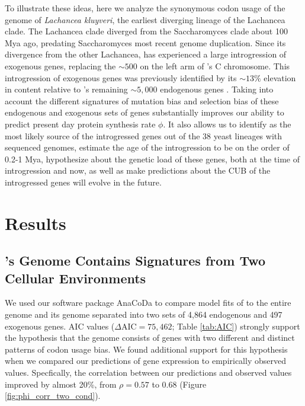 \documentclass[12pt]{article}
\begin{document}
To illustrate these ideas, here we analyze the synonymous codon usage of the genome of \emph{Lachancea kluyveri}, the earliest diverging lineage of the Lachancea clade.
The Lachancea clade diverged from the Saccharomyces clade about 100 Mya ago, predating Saccharomyces most recent genome duplication.
Since its divergence from the other Lachancea, \kluyveri has experienced a large introgression of exogenous genes, replacing the $\sim500$ on the left arm of \Klu's C chromosome.
This introgression of exogenous genes was previously identified by its $\sim13\%$ elevation in \GC content relative to \Klu's remaining $\sim5,000$ endogenous genes \citep{payen2009, friedrich2015}.
Taking into account the different signatures of mutation bias and selection bias of these endogenous and exogenous sets of genes substantially improves our ability to predict present day protein synthesis rate $\phi$.
It also allows us to identify \gossypii as the most likely source of the introgressed genes out of the 38 yeast lineages with sequenced genomes, estimate the age of the introgression to be on the order of 0.2-1 Mya, hypothesize about the genetic load of these genes, both at the time of introgression and now, as well as make predictions about the CUB of the introgressed genes will evolve in the future.

\section*{Results}
\subsection*{\Klu's Genome Contains Signatures from Two Cellular Environments}
We used our software package AnaCoDa \citep{landerer2018} to compare model fits of \ROC to the entire \kluyveri genome and its genome separated into two sets of 4,864 endogenous and 497 exogenous genes.
AIC values ($\Delta\text{AIC} = 75,462$; Table \ref{tab:AIC}) strongly support the hypothesis that the \kluyveri genome consists of genes with two different and distinct patterns of codon usage bias.
We found additional support for this hypothesis when we compared our predictions of gene expression to empirically observed values.
Specfically, the correlation between our predictions and observed values improved by almost 20\%, from $\rho = 0.57$ to 0.68 (Figure \ref{fig:phi_corr_two_cond}).
\end{document}
